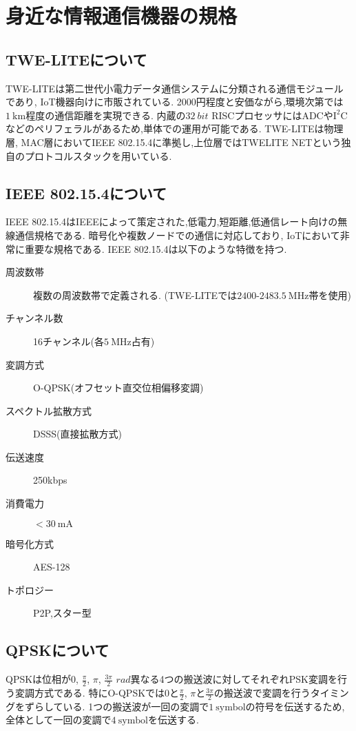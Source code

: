 \section{身近な情報通信機器の規格}
\subsection{TWE-LITE\textsuperscript{\textregistered}について}
TWE-LITEは第二世代小電力データ通信システムに分類される通信モジュールであり, IoT機器向けに市販されている.
2000円程度と安価ながら,環境次第では$1~\si{\kilo\metre}$程度の通信距離を実現できる.
内蔵の$32~\si{bit}$ RISCプロセッサにはADCや$\mathrm{I^2C}$などのペリフェラルがあるため,単体での運用が可能である.
TWE-LITEは物理層, MAC層においてIEEE 802.15.4に準拠し,上位層ではTWELITE NETという独自のプロトコルスタックを用いている\cite{twe-data}.
\subsection{IEEE 802.15.4について}
IEEE 802.15.4はIEEEによって策定された,低電力,短距離,低通信レート向けの無線通信規格である.
暗号化や複数ノードでの通信に対応しており, IoTにおいて非常に重要な規格である.
IEEE 802.15.4は以下のような特徴を持つ\cite{IEEE802198}.
\begin{description}
  \item[周波数帯]複数の周波数帯で定義される\cite{IEEEstd}. (TWE-LITEでは$2400$-$2483.5~\si{\mega\hertz}$帯を使用)
  \item[チャンネル数]16チャンネル(各$5~\si{\mega\hertz}$占有)
  \item[変調方式]O-QPSK(オフセット直交位相偏移変調)
  \item[スペクトル拡散方式]DSSS(直接拡散方式)  
  \item[伝送速度]250kbps
  \item[消費電力]$<30~\si{\milli\ampere}$
  \item[暗号化方式]AES-128
  \item[トポロジー]P2P,スター型\cite{IEEEstd}
\end{description}
\subsection{QPSKについて\cite{ZigBee}}
QPSKは位相が$0$, $\frac{\pi}{2}$, $\pi$, $\frac{3\pi}{2}$ $\si{rad}$異なる4つの搬送波に対してそれぞれPSK変調を行う変調方式である.
特にO-QPSKでは$0$と$\frac{\pi}{2}$, $\pi$と$\frac{3\pi}{2}$の搬送波で変調を行うタイミングをずらしている.
1つの搬送波が一回の変調で$1~\mathrm{symbol}$の符号を伝送するため,全体として一回の変調で$4~\mathrm{symbol}$を伝送する.
